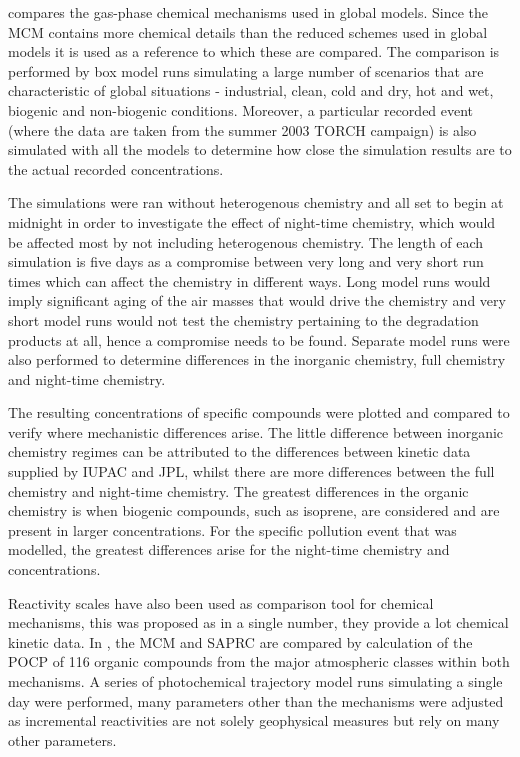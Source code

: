 \citep{Emmerson:2009} compares the gas-phase chemical mechanisms used in global models. Since the MCM contains more chemical 
details than the reduced schemes used in global models it is used as a reference to which these are compared. The comparison is 
performed by box model runs simulating a large number of scenarios that are characteristic of global situations - industrial, 
clean, cold and dry, hot and wet, biogenic and non-biogenic conditions. Moreover, a particular recorded event (where the data 
are taken from the summer 2003 TORCH campaign) is also simulated with all the models to determine how close the simulation 
results are to the actual recorded concentrations. 

The simulations were ran without heterogenous chemistry and all set to begin at midnight in order to investigate the effect of 
night-time chemistry, which would be affected most by not including heterogenous chemistry. The length of each simulation is 
five days as a compromise between very long and very short run times which can affect the chemistry in different ways. Long 
model runs would imply significant aging of the air masses that would drive the chemistry and very short model runs would not 
test the chemistry pertaining to the degradation products at all, hence a compromise needs to be found. Separate model runs were
also performed to determine differences in the inorganic chemistry, full chemistry and night-time chemistry.

The resulting concentrations of specific compounds were plotted and compared to verify where mechanistic differences arise. The 
little difference between inorganic chemistry regimes can be attributed to the differences between kinetic data supplied by 
IUPAC and JPL, whilst there are more differences between the full chemistry and night-time chemistry. The greatest differences 
in the organic chemistry is when biogenic compounds, such as isoprene, are considered and are present in larger concentrations. 
For the specific pollution event that was modelled, the greatest differences arise for the night-time chemistry and  
concentrations.

Reactivity scales have also been used as comparison tool for chemical mechanisms, this was proposed as in a single number, they 
provide a lot chemical kinetic data. In \citep{Derwent:2010}, the MCM and SAPRC are compared by calculation of the POCP of 116 
organic compounds from the major atmospheric classes within both mechanisms. A series of photochemical trajectory model runs 
simulating a single day were performed, many parameters other than the mechanisms were adjusted as incremental reactivities are 
not solely geophysical measures but rely on many other parameters.

